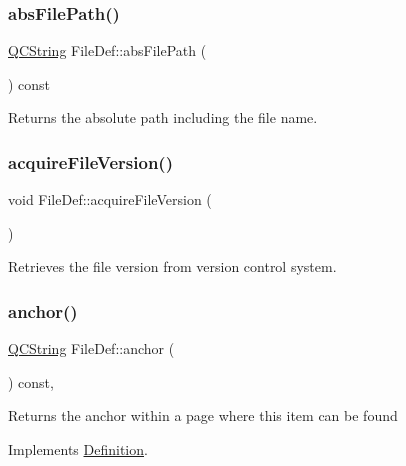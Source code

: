 \subsubsection{\texorpdfstring{absFilePath()}{absFilePath()}}
{\footnotesize\ttfamily \mbox{\hyperlink{class_q_c_string}{Q\+C\+String}} File\+Def\+::abs\+File\+Path (\begin{DoxyParamCaption}{ }\end{DoxyParamCaption}) const\hspace{0.3cm}{\ttfamily [inline]}}

Returns the absolute path including the file name. \mbox{\label{class_file_def_a5f297c95a2f5b8d2e1a7e3620b4c8d01}} 
\subsubsection{\texorpdfstring{acquireFileVersion()}{acquireFileVersion()}}
{\footnotesize\ttfamily void File\+Def\+::acquire\+File\+Version (\begin{DoxyParamCaption}{ }\end{DoxyParamCaption})\hspace{0.3cm}{\ttfamily [protected]}}

Retrieves the file version from version control system. \mbox{\label{class_file_def_a793b9b4a7196fd94226d4fab0a27a12d}} 
\subsubsection{\texorpdfstring{anchor()}{anchor()}}
{\footnotesize\ttfamily \mbox{\hyperlink{class_q_c_string}{Q\+C\+String}} File\+Def\+::anchor (\begin{DoxyParamCaption}{ }\end{DoxyParamCaption}) const\hspace{0.3cm}{\ttfamily [inline]}, {\ttfamily [virtual]}}

Returns the anchor within a page where this item can be found 

Implements \mbox{\hyperlink{class_definition_a56e91f9b76f41208a22cfb2336871604}{Definition}}.

\mbox{\label{class_file_def_a8ab814579e542ea5325a6d5d386c56a2}} 
